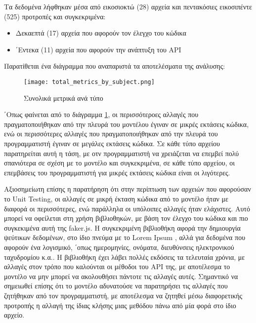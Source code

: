 Τα δεδομένα λήφθηκαν μέσα από εικοσιοκτώ (28) αρχεία και πεντακόσιες
εικοσιπέντε (525) προτροπές και συγκεκριμένα:
\begin{itemize}
\item
  Δεκαεπτά (17) αρχεία που αφορούν τον έλεγχο του κώδικα
\item
  ΄Εντεκα (11) αρχεία που αφορούν την ανάπτυξη του \textlatin{API}
\end{itemize}

Παρατίθεται ένα διάγραμμα που αναπαριστά τα αποτελέσματα της ανάλυσης:

\begin{figure}[H]
  \begin{center}
    \texttt{[image: total\_metrics\_by\_subject.png]}
    \caption{Συνολικά μετρικά ανά τύπο}
  \end{center}
  \label{fig:totalMetrics}
\end{figure}

΄Οπως φαίνεται από το διάγραμμα \ref{fig:totalMetrics}, οι περισσότεροες
αλλαγές που πραγματοποιήθηκαν από την πλευρά του μοντέλου έγιναν σε
μικρές εκτάσεις κώδικα, ενώ οι περισσότερες αλλαγές που
πραγματοποιήθηκαν από την πλευρά του προγραμματιστή έγιναν σε μεγάλες
εκτάσεις κώδικα. Σε κάθε τύπο αρχείου παρατηρείται αυτή η τάση, με οτν
προγραμματιστή να χρειάζεται να επεμβεί πολύ σπανιότερα σε σχέση με το
μοντέλο και συγκεκριμένα, σε κάθε τύπο αρχείου, οι επεμβάσεις του
προγραμματιστή για μικρές εκτάσεις κώδικα είναι οι λιγότερες.

Αξιοσημείωτη επίσης η παρατήρηση ότι στην περίπτωση των αρχειών που
αφορούσαν το \textlatin{Unit Testing}, οι αλλαγές σε μικρή έκταση κώδικα
από το μοντέλο ήταν με διαφορά οι περισσότερες, ενώ παράλληλα οι
υπόλοιπες αλλαγές ήταν ελάχιστες. Αυτό μπορεί να οφείλεται στη χρήση
βιβλιοθηκών, με βάση τον έλεγχο του κώδικα και πιο συγκεκιμένα αυτή της
\textlatin{faker.js}\cite{fakerjs}. Η συγκεκριμένη βιβλιοθήκη αφορά την
δημιουργία ψεύτικων δεδομένων, στο ίδιο πνεύμα με το \textlatin{Lorem
  Ipsum} \cite{lipsum}, αλλά για δεδομένα που αφορούν ένα λογισμικό,
΄οπως ημερομηνίες, ονόματα, διευθύνσεις ηλεκτρονικού ταχυδρομίου κ.α.. Η
βιβλιοθήκη έχει λάβει πολλές εκδόσεις τα τελευταία χρόνια, με αλλαγές
στον τρόπο που καλούνται οι μέθοδοι του \textlatin{API} της, με
αποτέλεσμα το μοντέλο να μην μπορεί να ακολουθήσει πάντοτε τις αλλαγές
αυτές. Σημαντικό να σημειωθεί επίσης ότι το μοντέλο αδυνατούσε να
παρατηρήσει τις αλλαγές που ζητήθηκαν από τον προγραμματιστή, με
αποτέλεσμα να ζητηθεί μέσω διαφορετικής προτροπής η αλλαγή της ίδιας
κλήσης μιας μεθόδου πάνω από μία φορά στο ίδιο αρχείο.

